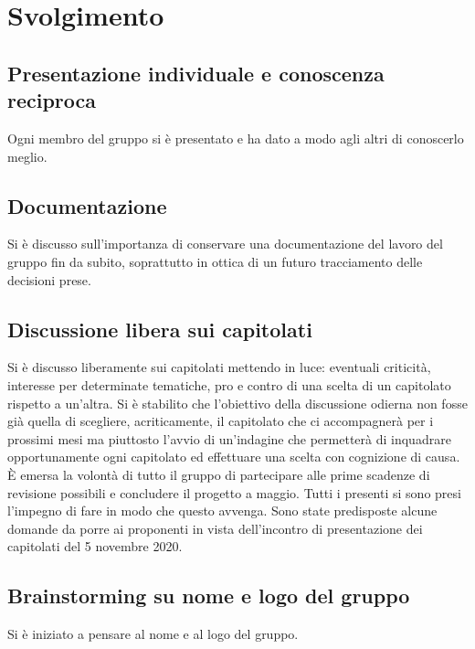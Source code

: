 \newpage

\section*{Svolgimento}
\subsection*{Presentazione individuale e conoscenza reciproca}
Ogni membro del gruppo si è presentato e ha dato a modo agli altri di conoscerlo meglio.

\subsection*{Documentazione}
Si è discusso sull'importanza di conservare una documentazione del lavoro del gruppo fin da subito, soprattutto in ottica di un futuro tracciamento delle decisioni prese.

\subsection*{Discussione libera sui capitolati}
Si è discusso liberamente sui capitolati mettendo in luce: eventuali criticità, interesse per determinate tematiche, pro e contro di una scelta di un capitolato rispetto a un'altra. Si è stabilito che l'obiettivo della discussione odierna non fosse già quella di scegliere, acriticamente, il capitolato che ci accompagnerà per i prossimi mesi  ma piuttosto l'avvio di un'indagine che permetterà di inquadrare opportunamente ogni capitolato ed effettuare una scelta con cognizione di causa. 
È emersa la volontà di tutto il gruppo di partecipare alle prime scadenze di revisione possibili e concludere il progetto a maggio. Tutti i presenti si sono presi l'impegno di fare in modo che questo avvenga. Sono state predisposte alcune domande da porre ai proponenti in vista dell'incontro di presentazione dei capitolati del 5 novembre 2020.

\subsection*{Brainstorming su nome e logo del gruppo}
Si è iniziato a pensare al nome e al logo del gruppo.